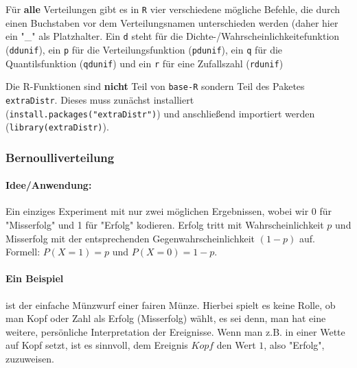 \documentclass[a4paper]{article}
\newcommand\dangersign{%
 \makebox[1.8em][c]{%
 \makebox[0pt][c]{\raisebox{.15em}{\small!}}%
 \makebox[0pt][c]{\color{red}\Large$\triangle$}}}%
\begin{document}
\noindent \dangersign Für \textbf{alle} Verteilungen gibt es in \texttt{R} vier verschiedene mögliche Befehle, die durch einen Buchstaben vor dem Verteilungsnamen unterschieden werden (daher hier ein "\_" als Platzhalter. Ein \texttt{d} steht für die Dichte-/Wahrscheinlichkeitefunktion (\texttt{ddunif}), ein \texttt{p} für die Verteilungsfunktion (\texttt{pdunif}), ein \texttt{q} für die Quantilsfunktion (\texttt{qdunif}) und ein \texttt{r} für eine Zufallszahl (\texttt{rdunif})

\noindent \dangersign Die R-Funktionen sind \textbf{nicht} Teil von \texttt{base-R} sondern Teil des Paketes \texttt{extraDistr}. Dieses muss zunächst installiert (\texttt{install.packages("extraDistr")}) und anschließend importiert werden (\texttt{library(extraDistr)}).

\subsubsection{Bernoulliverteilung} \label{sec:Ber}

\paragraph{Idee/Anwendung:}  Ein einziges Experiment mit nur zwei möglichen Ergebnissen, wobei wir 0 für "Misserfolg" und 1 für "Erfolg" kodieren. Erfolg tritt mit Wahrscheinlichkeit $p$ und Misserfolg mit der entsprechenden Gegenwahrscheinlichkeit $(1-p)$ auf. Formell: $P(X=1)=p$ und $P(X=0)=1-p$. 

\paragraph{Ein Beispiel} ist der einfache Münzwurf einer fairen Münze. Hierbei spielt es keine Rolle, ob man Kopf oder Zahl als Erfolg (Misserfolg) wählt, es sei denn, man hat eine weitere, persönliche Interpretation der Ereignisse. Wenn man z.B. in einer Wette auf Kopf setzt, ist es sinnvoll, dem Ereignis $Kopf$ den Wert $1$, also "Erfolg", zuzuweisen.
\end{document}
